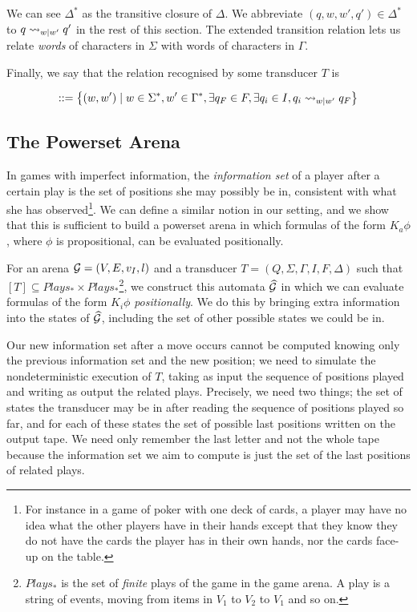 \documentclass[10pt, a4paper]{report}
\begin{document}
We can see $\Delta^\ast$ as the transitive closure of $\Delta$. We abbreviate
$(q, w, w', q') \in \Delta^\ast$ to $q \rightsquigarrow_{w \mid w'} q'$ in the rest of
this section. The extended transition relation lets us relate \emph{words} of
characters in $\Sigma$ with words of characters in $\Gamma$. 

Finally, we say that the relation recognised by some transducer $T$ is

\begin{align*}
  [T] ::= \left\{ (w, w') \mid w \in \Sigma^\ast, w' \in \Gamma^\ast, \exists q_F \in F, \exists q_i \in I, q_i \rsarrow_{w \mid w'} q_F \right\}
\end{align*}

\subsection{The Powerset Arena}
\label{sec:PowersetArena}

In games with imperfect information, the \emph{information set} of a player after a
certain play is the set of positions she may possibly be in, consistent with
what she has observed\footnote{For instance in a game of poker with one deck of cards, a
player may have no idea what the other players have in their hands except that
they know they do not have the cards the player has in their own hands, nor the
cards face-up on the table.}. We can define a similar notion in our setting, and
we show that this is sufficient to build a powerset arena in which formulas of
the form $K_a \phi$, where $\phi$ is propositional, can be evaluated positionally. 

For an arena $\mathcal{G} = (V, E, v_I, l)$ and a transducer $T = (Q, \Sigma, \Gamma,
I, F, \Delta)$ such that $[T] \subseteq Plays_\ast \times
Plays_\ast$\footnote{$Plays_\ast$ is the set of \emph{finite} plays of the game
  in the game arena. A play is a string of events, moving from items in $V_1$ to
  $V_2$ to $V_1$ and so on.}, we construct this automata $\widehat{\mathcal{G}}$ in
which we can evaluate formulas of the form $K_i \phi$ \emph{positionally}. We do
this by bringing extra information into the states of $\widehat{\mathcal{G}}$, including
the set of other possible states we could be in.

Our new information set after a move occurs cannot be computed knowing only the
previous information set and the new position; we need to simulate the
nondeterministic execution of $T$, taking as input the sequence of positions
played and writing as output the related plays. Precisely, we need two things;
the set of states the transducer may be in after reading the sequence of
positions played so far, and for each of these states the set of possible last
positions written on the output tape. We need only remember the last letter and
not the whole tape because the information set we aim to compute is just the set
of the last positions of related plays.
\end{document}
